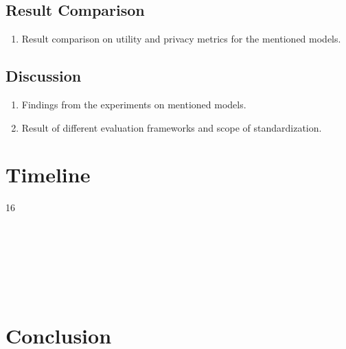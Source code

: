 \documentclass[master,proposal,extern,palatino]{rgseThesis}
\begin{document}
\subsection{Result Comparison}
\begin{enumerate}
    \item Result comparison on utility and privacy metrics for the mentioned models.

\end{enumerate}

\subsection{Discussion}
\begin{enumerate}
    \item Findings from the experiments on mentioned models. 
    \item Result of different evaluation frameworks and scope of standardization.
\end{enumerate}

\section{Timeline}

\begin{ganttchart}[
    x unit=1.8cm,            %
    y unit chart=0.7cm,
    vgrid, hgrid,
    bar height=0.6,
    bar top shift=0.2,
    bar label font=\small,
]{1}{6}
   \\
   \\

   \\
   \\
  \\
  \\
  \\
\end{ganttchart}

\section{Conclusion}
\end{document}
